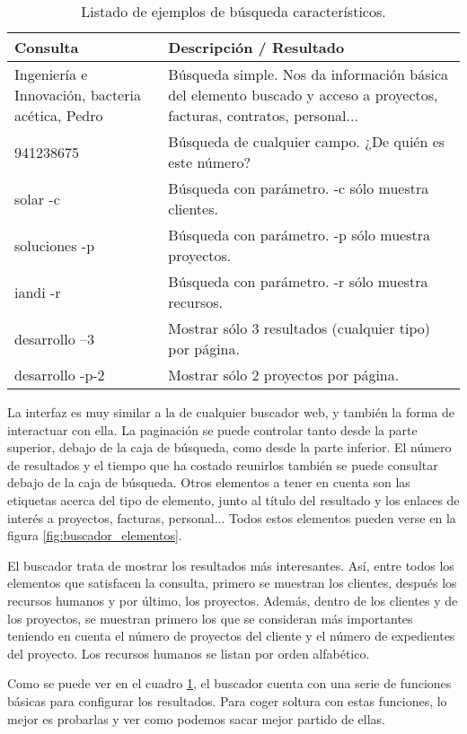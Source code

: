 \begin{table}
\centering
\begin{tabular}{|p{1.28in}|p{4in}|}\hline
Consulta & Descripción / Resultado \\\hline\hline
Ingeniería e Innovación, bacteria acética, Pedro & Búsqueda simple. Nos da
información básica del elemento buscado y acceso a proyectos, facturas,
contratos, personal...\\\hline
941238675 & Búsqueda de cualquier campo. ¿De quién es este número?\\\hline
solar -c & Búsqueda con parámetro. -c sólo muestra clientes.\\\hline
soluciones -p & Búsqueda con parámetro. -p sólo muestra proyectos.\\\hline
iandi -r & Búsqueda con parámetro. -r sólo muestra recursos.\\\hline
desarrollo --3 & Mostrar sólo 3 resultados (cualquier tipo) por página.\\\hline
desarrollo -p-2 & Mostrar sólo 2 proyectos por página.\\\hline
\end{tabular}
\caption{Listado de ejemplos de búsqueda característicos.}
\label{cua:buscador_opciones}
\end{table}

La interfaz es muy similar a la de cualquier buscador web, y también la forma
de interactuar con ella. La paginación se puede controlar tanto desde la
parte superior, debajo de la caja de búsqueda, como desde la parte inferior. El
número de resultados y el tiempo que ha costado reunirlos también se puede
consultar debajo de la caja de búsqueda. Otros elementos a tener en cuenta son
las etiquetas acerca del tipo de elemento, junto al título del resultado y los
enlaces de interés a proyectos, facturas, personal... Todos estos elementos
pueden verse en la figura \ref{fig:buscador_elementos}.

El buscador trata de mostrar los resultados más interesantes. Así, entre todos
los elementos que satisfacen la consulta, primero se muestran los clientes,
después los recursos humanos y por último, los proyectos. Además, dentro de los
clientes y de los proyectos, se muestran primero los que se consideran más
importantes teniendo en cuenta el número de proyectos del cliente y el número
de expedientes del proyecto. Los recursos humanos se listan por orden
alfabético.

Como se puede ver en el cuadro \ref{cua:buscador_opciones}, el buscador cuenta
con una serie de funciones básicas para configurar los resultados. Para coger
soltura con estas funciones, lo mejor es probarlas y ver como podemos sacar
mejor partido de ellas.

